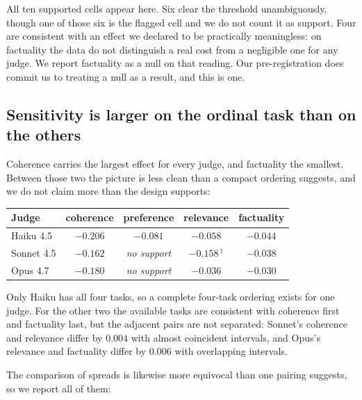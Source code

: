\documentclass[11pt]{article}          %
\begin{document}

All ten supported cells appear here. Six clear the threshold unambiguously,
though one of those six is the flagged cell and we do not count it as support.
Four are consistent with an effect we declared to be practically meaningless: on
factuality the data do not distinguish a real cost from a negligible one for any
judge. We report factuality as a null on that reading. Our pre-registration does
commit us to treating a null as a result, and this is one.

\subsection{Sensitivity is larger on the ordinal task than on the others}

Coherence carries the largest effect for every judge, and factuality the
smallest. Between those two the picture is less clean than a compact ordering
suggests, and we do not claim more than the design supports:

\begin{center}
\begin{tabular}{lcccc}
\toprule
Judge & coherence & preference & relevance & factuality \\
\midrule
Haiku 4.5   & $-0.206$ & $-0.081$          & $-0.058$          & $-0.044$ \\
Sonnet 4.5  & $-0.162$ & \emph{no support} & $-0.158$\,$^{\dagger}$ & $-0.038$ \\
Opus 4.7    & $-0.180$ & \emph{no support} & $-0.036$          & $-0.030$ \\
\bottomrule
\end{tabular}
\end{center}


Only Haiku has all four tasks, so a complete four-task ordering exists for one
judge. For the other two the available tasks are consistent with coherence
first and factuality last, but the adjacent pairs are not separated: Sonnet's
coherence and relevance differ by $0.004$ with almost coincident intervals, and
Opus's relevance and factuality differ by $0.006$ with overlapping intervals.

The comparison of spreads is likewise more equivocal than one pairing suggests,
so we report all of them:
\end{document}
